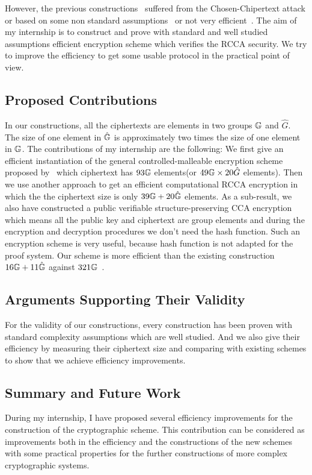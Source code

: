 However, the previous constructions~\cite{DBLP:conf/ctrsa/GolleJJS04} suffered from the Chosen-Chipertext attack or based on some non standard assumptions~\cite{DBLP:conf/crypto/PrabhakaranR07} or not very efficient~\cite{DBLP:conf/eurocrypt/ChaseKLM12}.
The aim of my internship is to construct and prove with standard and well studied assumptions efficient encryption scheme which verifies the RCCA security.
We try to improve the efficiency to get some usable protocol in the practical point of view.

\subsection*{Proposed Contributions}
In our constructions, all the ciphertexts are elements in two groups $\mathbb{G}$ and $\hat{G}$.
The size of one element in $\hat{\mathbb{G}}$ is approximately two times the size of one element in $\mathbb{G}$.
The contributions of my internship are the following:
We first give an efficient instantiation of the general controlled-malleable encryption scheme proposed by~\cite{DBLP:conf/eurocrypt/ChaseKLM12} which ciphertext has $93\mathbb{G}$ elements(or $49\mathbb{G} \times 20\hat{G}$ elements).
Then we use another approach to get an efficient computational RCCA encryption in which the the ciphertext size is only $39\mathbb{G} + 20 \hat{\mathbb{G}}$ elements.
As a sub-result, we also have constructed a public verifiable structure-preserving CCA encryption which means all the public key and ciphertext are group elements and during the encryption and decryption procedures we don't need the hash function.
Such an encryption scheme is very useful, because hash function is not adapted for the proof system.
Our scheme is more efficient than the existing construction $16\mathbb{G} + 11\hat{\mathbb{G}}$ against $321\mathbb{G}$~\cite{DBLP:conf/pkc/AbeDKNO13}.

\subsection*{Arguments Supporting Their Validity}
For the validity of our constructions,
every construction has been proven with standard complexity assumptions which are well studied.
And we also give their efficiency by measuring their ciphertext size and comparing with existing schemes to show that we achieve efficiency improvements.

\subsection*{Summary and Future Work}
During my internship, I have proposed several efficiency improvements for the construction of the cryptographic scheme.
This contribution can be considered as improvements both in the efficiency and the constructions of the new schemes with some practical properties for the further constructions of more complex cryptographic systems.

